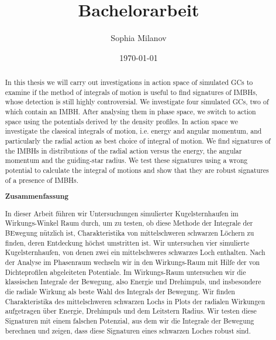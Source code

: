 \documentclass[a4paper,12pt,abstracton]{scrartcl}
\title{Bachelorarbeit}
\author{Sophia Milanov}
\date{\today}
\begin{document}
 

\onehalfspacing


\begin{abstract}
\hspace{-12pt}In this thesis we will carry out investigations in action space of simulated \acp*{GC} to examine if the method of integrals of motion is useful to find signatures of \acp*{IMBH}, whose detection is still highly controversial. We investigate four simulated \acsp*{GC}, two of which contain an \acs*{IMBH}. After analysing them in phase space, we switch to action space using the potentials derived by the density profiles. In action space we investigate the classical integrals of motion, i.e. energy and angular momentum, and particularly the radial action as best choice of integral of motion. We find signatures of the \acsp*{IMBH} in distributions of the radial action versus the energy, the angular momentum and the guiding-star radius. We test these signatures using a wrong potential to calculate the integral of motions and show that they are robust signatures of a presence of \acsp*{IMBH}. 
\vspace{5cm}
\begin{center}
 \textbf{Zusammenfassung}
\end{center}
In dieser Arbeit führen wir Untersuchungen simulierter Kugelsternhaufen im Wirkungs-Winkel Raum durch, um zu testen, ob diese Methode der Integrale der BEwegung nützlich ist, Charakteristika von mittelschweren schwarzen Löchern zu finden, deren Entdeckung höchst umstritten ist. Wir untersuchen vier simulierte Kugelsternhaufen, von denen zwei ein mittelschweres schwarzes Loch enthalten. Nach der Analyse im Phasenraum wechseln wir in den Wirkungs-Raum mit Hilfe der von Dichteprofilen abgeleiteten Potentiale. Im Wirkungs-Raum untersuchen wir die klassischen Integrale der Bewegung, also Energie und Drehimpuls, und insbesondere die radiale Wirkung als beste Wahl des Integrals der Bewegung. Wir finden Charakteristika des mittelschweren schwarzen Lochs in Plots der radialen Wirkungen aufgetragen über Energie, Drehimpuls und dem Leitstern Radius. Wir testen diese Signaturen mit einem falschen Potenzial, aus dem wir die Integrale der Bewegung berechnen und zeigen, dass diese Signaturen eines schwarzen Loches robust sind.
\end{abstract}

\newpage
{}
\tableofcontents

\newpage
{}
\end{document}
